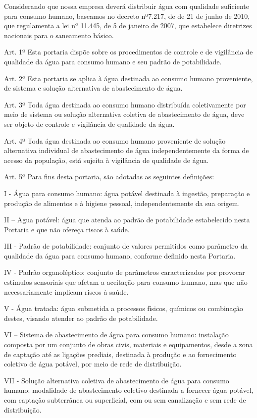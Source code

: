 Considerando que nossa empresa deverá distribuir água com qualidade suficiente para consumo humano, baseamos no decreto nº7.217, de de 21 de junho de 2010, que regulamenta a lei nº 11.445, de 5 de janeiro de 2007, que estabelece diretrizes nacionais para o saneamento básico.

Art. 1º Esta portaria dispõe sobre os procedimentos de controle e de vigilância de qualidade da água para consumo humano e seu padrão de potabilidade.

Art. 2º Esta portaria se aplica à água destinada ao consumo humano proveniente, de sistema e solução alternativa de abastecimento de água.

Art. 3º Toda água destinada ao consumo humano distribuída coletivamente por meio de sistema ou solução alternativa coletiva de abastecimento de água, deve ser objeto de controle e vigilância de qualidade da água.

Art. 4º Toda água destinada ao consumo humano proveniente de solução alternativa individual de abastecimento de água independentemente da forma de acesso da população, está sujeita à vigilância de qualidade de água.

Art. 5º Para fins desta portaria, são adotadas as seguintes definições:

I - Água para consumo humano: água potável destinada à ingestão, preparação e produção de alimentos e à higiene pessoal, independentemente da sua origem.

II – Agua potável: água que atenda ao padrão de potabilidade estabelecido nesta Portaria e que não ofereça riscos à saúde.

III - Padrão de potabilidade: conjunto de valores permitidos como parâmetro da qualidade da água para consumo humano, conforme definido nesta Portaria.

IV - Padrão organoléptico: conjunto de parâmetros caracterizados por provocar estímulos sensoriais que afetam a aceitação para consumo humano, mas que não necessariamente implicam riscos à saúde.

V - Água tratada: água submetida a processos físicos, químicos ou combinação destes, visando atender ao padrão de potabilidade.

VI – Sistema de abastecimento de água para consumo humano: instalação composta por um conjunto de obras civis, materiais e equipamentos, desde a zona de captação até as ligações prediais, destinada à produção e ao fornecimento coletivo de água potável, por meio de rede de distribuição.

VII - Solução alternativa coletiva de abastecimento de água para consumo humano: modalidade de abastecimento coletivo destinada a fornecer água potável, com captação subterrânea ou superficial, com ou sem canalização e sem rede de distribuição.

